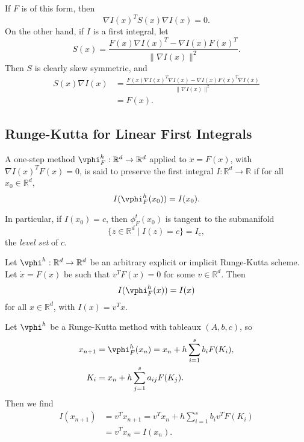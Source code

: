 \documentclass[12pt]{article}
\begin{document}
\begin{proofbox}
	If $F$ is of this form, then
	\[
	\nabla I(x)^{T} S(x) \nabla I(x) = 0.
	\]
	On the other hand, if $I$ is a first integral, let
	\[
	S(x) = \frac{F(x) \nabla I(x)^{T} - \nabla I(x) F(x)^{T}}{\|\nabla I(x)\|^2}.
	\]
	Then $S$ is clearly skew symmetric, and
	\begin{align*}
		S(x) \nabla I(x) &= \frac{F(x) \nabla I(x)^{T} \nabla I(x) - \nabla I(x) F(x)^{T} \nabla I(x)}{\|\nabla I(x)\|^2} \\
				 &= F(x).
	\end{align*}
\end{proofbox}

\subsection{Runge-Kutta for Linear First Integrals}%
\label{sub:rkl}

\begin{definition}
	A one-step method $\vphi_F^{h} : \mathbb{R}^{d} \to \mathbb{R}^{d}$ applied to $\dot x = F(x)$, with $\nabla I(x)^{T} F(x) = 0$, is said to preserve the first integral $I : \mathbb{R}^{d} \to \mathbb{R}$ if for all $x_0 \in \mathbb{R}^{d}$,
	\[
	I(\vphi_F^{h}(x_0)) = I(x_0).
	\]
\end{definition}

In particular, if $I(x_0) = c$, then $\phi_F^{t}(x_0)$ is tangent to the submanifold
\[
	\{z \in \mathbb{R}^{d} \mid I(z) = c\} = I_c,
\]
the \emph{level set} of $c$.

\begin{theorem}
	Let $\vphi^{h} : \mathbb{R}^{d} \to \mathbb{R}^{d}$ be an arbitrary explicit or implicit Runge-Kutta scheme. Let $\dot x = F(x)$ be such that $v^{T} F(x) = 0$ for some $v \in \mathbb{R}^{d}$. Then
	\[
	I(\vphi_F^{h}(x)) = I(x)
	\]
	for all $x \in \mathbb{R}^{d}$, with $I(x) = v^{T}x$.
\end{theorem}

\begin{proofbox}
	Let $\vphi^{h}$ be a Runge-Kutta method with tableaux $(A, b, c)$, so
	\begin{align*}
		x_{n+1} &= \vphi_F^{h}(x_n) = x_n + h \sum_{i = 1}^s b_i F(K_i), \\
		K_i &= x_n + h \sum_{j = 1}^s a_{ij} F(K_j).
	\end{align*}
	Then we find
	\begin{align*}
		I(x_{n+1}) &= v^{T}x_{n+1} = v^{T}x_n + h \sum_{i = 1}^s b_i v^{T} F(K_i) \\
			   &= v^{T} x_n = I(x_n).
	\end{align*}
\end{proofbox}
\end{document}
